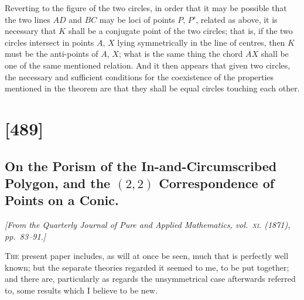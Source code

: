 \documentclass[11pt,a4paper]{book}
\begin{document}
Reverting to the figure of the two circles, in order that it may be possible that
the two lines $AD$ and $BC$ may be loci of points $P$, $P'$, related as above, it is necessary
that $K$ shall be a conjugate point of the two circles; that is, if the two circles intersect in points $A$, $X$ lying symmetrically in the line of centres, then $K$ must be the
anti-points of $A$, $X$; what is the same thing the chord $AX$ shall be one of the same
mentioned relation.  And it then appears that given two circles, the necessary and
sufficient conditions for the coexistence of the properties mentioned in the theorem are
that they shall be equal circles touching each other.

\clearpage

\section{[489]}
\subsection{On the Porism of the In-and-Circumscribed Polygon, and the $(2,2)$ Correspondence of Points on a Conic.}

\begin{center}
\textit{[From the Quarterly Journal of Pure and Applied Mathematics, vol.~\textsc{xi}. (1871), pp.~83--91.]}
\end{center}

\textsc{The} present paper includes, as will at once be seen, much that is perfectly well
known; but the separate theories regarded it seemed to me, to be put together; and
there are, particularly as regards the unsymmetrical case afterwards referred to, some results which I believe to be new.
\end{document}
